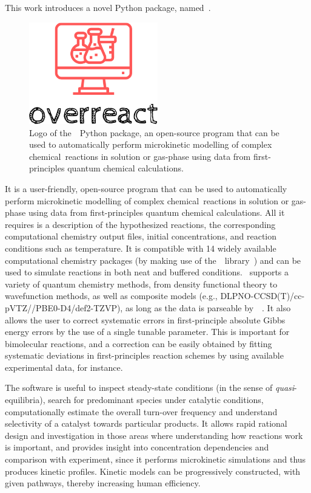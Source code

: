 This work introduces a novel Python package,
named~\overreact{}.
%
\begin{figure}[hbtp]
	\centering
	\includegraphics[width=0.5\textwidth]{slides/public/overreact-logo}
	\caption{Logo of the~\overreact{}~Python package,
		an open-source program that can be used
		to automatically perform microkinetic modelling of complex chemical~reactions in solution or gas-phase
		using data from first-principles quantum chemical calculations.}\label{fig:overreact-logo}
\end{figure}
%
It is a user-friendly,
open-source program that can be used
to automatically perform microkinetic modelling of complex chemical~reactions in solution or gas-phase
using data from first-principles quantum chemical calculations.
All it requires is a description of the hypothesized reactions,
the corresponding computational chemistry output files,
initial concentrations,
and reaction conditions such as temperature.
It is compatible with 14 widely available computational chemistry packages
(by making use of the~\cclib{}~library~\cite{O_boyle_2008})
and can be used to simulate reactions in both neat and buffered conditions.
\overreact{}~supports a variety of quantum chemistry methods,
from density functional theory to wavefunction methods,
as well as composite models (e.g.,
DLPNO-CCSD(T)/cc-pVTZ//PBE0-D4/def2-TZVP),
as long as the data is parseable by~\cclib{}~\cite{O_boyle_2008}.
It also allows the user to correct systematic errors in first-principle absolute Gibbs energy errors
by the use of a single tunable parameter.
This is important for bimolecular reactions,
and a correction can be easily obtained by fitting systematic deviations
in first-principles reaction schemes by using available experimental data,
for instance.

The software is useful to inspect steady-state conditions (in the sense of \emph{quasi}-equilibria),
search for predominant species under catalytic conditions,
computationally estimate the overall turn-over frequency and understand selectivity of a catalyst towards particular products.
It allows rapid rational design and investigation in those areas where understanding how reactions work is important,
and provides insight into concentration dependencies and comparison with experiment,
since it performs microkinetic simulations
and thus produces kinetic profiles.
Kinetic models can be progressively constructed,
with given pathways,
thereby increasing human efficiency.

